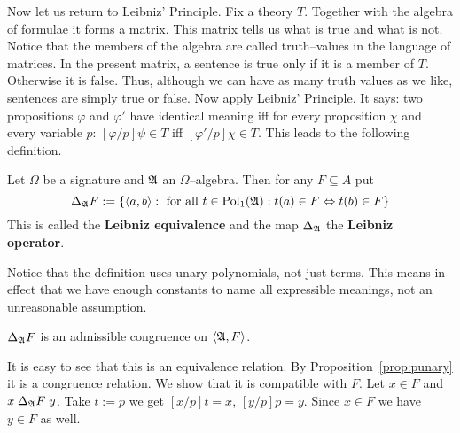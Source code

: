 Now let us return to Leibniz' Principle.  Fix a theory $T$. Together
with the algebra of formulae it forms a matrix. This matrix tells us
what is true and what is not. Notice that the members of the algebra
are called truth--values in the language of matrices. In the
present matrix, a sentence is true only if it is a member of $T$.
Otherwise it is false. Thus, although we can have as many truth values
as we like, sentences are simply true or false. Now apply Leibniz'
Principle. It says: two propositions $\varphi$ and $\varphi'$ have
identical meaning iff for every proposition $\chi$ and
every variable $p$: $[\varphi/p]\psi \in T$
iff $[\varphi'/p]\chi \in T$. This leads to the following
definition.
\begin{defn}
Let $\Omega$ be a signature and $\mathfrak{A}$ an $\Omega$--algebra. Then for
any $F \subseteq A$ put
\begin{equation}
\Delta_{\mathfrak{A}}F := \{\langle a,b\rangle : \mbox{ for all }t \in
    \operatorname{Pol}_1(\mathfrak{A}): t(a) \in F \Leftrightarrow t(b) \in F\}
\end{equation}
This is called the \textbf{Leibniz equivalence} 
and the map $\Delta_{\mathfrak{A}}$ the \textbf{Leibniz operator}.
\end{defn}
Notice that the definition uses unary polynomials, not just terms.
This means in effect that we have enough constants to name all
expressible meanings, not an unreasonable assumption.
\begin{lem}
$\Delta_{\mathfrak{A}}F$ is an admissible congruence on $\langle \mathfrak{A}, F\rangle$.
\end{lem}
\proofbeg%
It is easy to see that this is an equivalence relation. By
Proposition~\ref{prop:punary} it is a congruence relation. We show
that it is compatible with $F$. Let $x \in F$ and $x\; \Delta_{\mathfrak{A}}F\;
y$. Take $t := p$ we get $[x/p]t = x$, $[y/p]p = y$. Since $x \in
F$ we have $y \in F$ as well.%
\proofend

